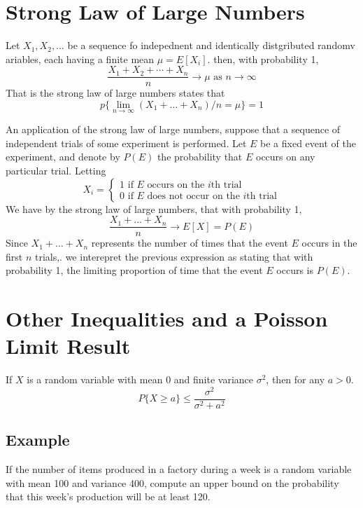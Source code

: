 \section{Strong Law of Large Numbers}
\begin{theorem}
    Let $X_1, X_2, \dots $ be a sequence fo indepednent and identically distgributed randomv ariables, each having a finite mean $\mu = E[X_i]$. then, with probability 1, \[\frac{X_1 + X_2 + \cdots + X_n}{n}\rightarrow \mu \text{ as } n\rightarrow\infty\] That is the strong law of large numbers states that \[p\{\lim_{n\rightarrow\infty} (X_1 + \dots + X_n)/n = \mu\} = 1\]
\end{theorem}
An application of the strong law of large numbers, suppose that a sequence of
independent trials of some experiment is performed. Let $E$ be a fixed event of the
experiment, and denote by $P(E)$ the probability that $E$ occurs on any particular
trial. Letting
\begin{equation*}
    X_i = 
    \begin{cases}
        1 \text{ if } E \text{ occurs on the } i \text{th trial}\\
        0 \text{ if } E \text{ does not occur on the } i \text{th trial}
    \end{cases}
\end{equation*}
We have by the strong law of large numbers, that with probability 1, \[\frac{X_1 + \dots + X_n}{n}\rightarrow E[X] = P(E)\] Since  $X_1 + \dots + X_n$ represents the number of times that the event $E$ occurs in the first $n$ trials,. we interepret the previous expression as stating that with probability 1, the limiting proportion of time that the event $E$ occurs is $P(E)$.
\section{Other Inequalities and a Poisson Limit Result}
\begin{definition}
    If $X$ is a random variable with mean $0$ and finite variance $\sigma^2$, then for any $a > 0$. \[P\{X\geq a\}\leq \frac{\sigma^2}{\sigma^2 + a^2}\]
\end{definition}
\subsection*{Example}
If the number of items produced in a factory during a week is a random variable
with mean 100 and variance 400, compute an upper bound on the probability that
this week’s production will be at least 120.
